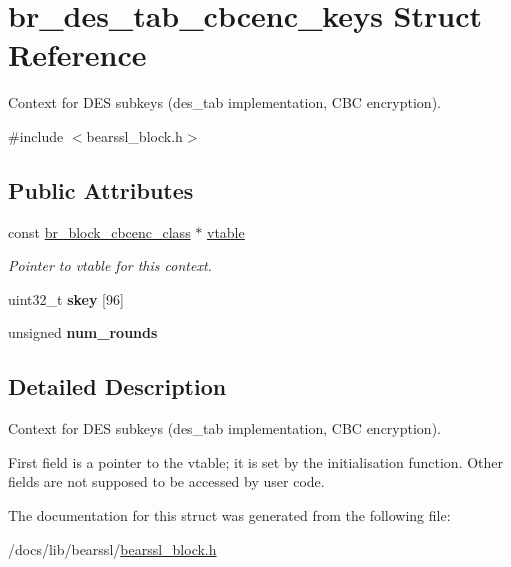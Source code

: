 \hypertarget{structbr__des__tab__cbcenc__keys}{}\section{br\+\_\+des\+\_\+tab\+\_\+cbcenc\+\_\+keys Struct Reference}
\label{structbr__des__tab__cbcenc__keys}


Context for D\+ES subkeys ({\ttfamily des\+\_\+tab} implementation, C\+BC encryption).  




{\ttfamily \#include $<$bearssl\+\_\+block.\+h$>$}

\subsection*{Public Attributes}
\begin{DoxyCompactItemize}
\item 
\mbox{\label{structbr__des__tab__cbcenc__keys_a3697bd9d96b0a24bd8f932858e319b6a}} 
const \hyperlink{bearssl__block_8h_ad0ecff523e21a74dc1143dcfa52aa251}{br\+\_\+block\+\_\+cbcenc\+\_\+class} $\ast$ \hyperlink{structbr__des__tab__cbcenc__keys_a3697bd9d96b0a24bd8f932858e319b6a}{vtable}
\begin{DoxyCompactList}\small\item\em Pointer to vtable for this context. \end{DoxyCompactList}\item 
\mbox{\label{structbr__des__tab__cbcenc__keys_ad5f560fcc1468a71d9ae2146d2da4fa9}} 
uint32\+\_\+t {\bfseries skey} \mbox{[}96\mbox{]}
\item 
\mbox{\label{structbr__des__tab__cbcenc__keys_a7dde416b2bd6176f902b26dde516bf0c}} 
unsigned {\bfseries num\+\_\+rounds}
\end{DoxyCompactItemize}


\subsection{Detailed Description}
Context for D\+ES subkeys ({\ttfamily des\+\_\+tab} implementation, C\+BC encryption). 

First field is a pointer to the vtable; it is set by the initialisation function. Other fields are not supposed to be accessed by user code. 

The documentation for this struct was generated from the following file\+:\begin{DoxyCompactItemize}
\item 
/docs/lib/bearssl/\hyperlink{bearssl__block_8h}{bearssl\+\_\+block.\+h}\end{DoxyCompactItemize}

